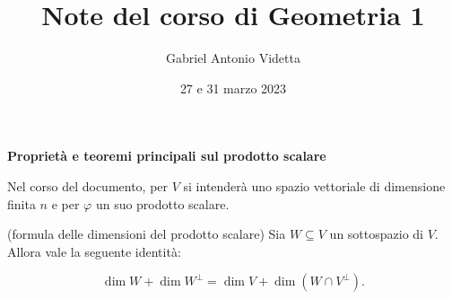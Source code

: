 \documentclass[11pt]{article}
\title{\textbf{Note del corso di Geometria 1}}
\author{Gabriel Antonio Videtta}
\date{27 e 31 marzo 2023}
\begin{document}
	
	\maketitle
	
	\wip
	
	\begin{center}
		\Large \textbf{Proprietà e teoremi principali sul prodotto scalare}
	\end{center}
	
	\begin{note}
		Nel corso del documento, per $V$ si intenderà uno spazio vettoriale di dimensione
		finita $n$ e per $\varphi$ un suo prodotto scalare.
	\end{note}
	
	\begin{proposition} (formula delle dimensioni del prodotto scalare)
		Sia $W \subseteq V$ un sottospazio di $V$. Allora vale la seguente identità:
		
		\[ \dim W + \dim W^\perp = \dim V + \dim (W \cap V^\perp). \]
	\end{proposition}
\end{document}
